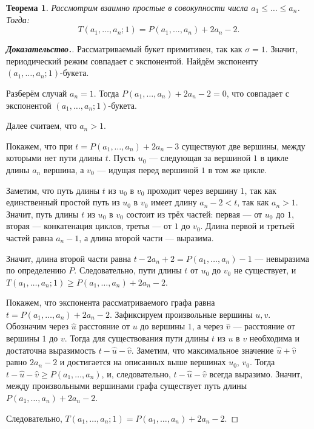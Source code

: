 \documentclass[12pt]{article}
\newtheorem{theorem}{Теорема}[section]
\theoremstyle{definition}
\begin{document}
\begin{theorem}
\label{thTP}
Рассмотрим взаимно простые в совокупности числа $a_1 \le \dots \le a_n$. Тогда: 
\begin{equation*}
T(a_1, \dots, a_n; 1) = P(a_1, \dots, a_n) + 2a_n - 2.
\end{equation*}
\end{theorem}
\begin{proof}[\textbf{Доказательство.}]
Рассматриваемый букет примитивен, так как $\sigma = 1$. Значит, периодический режим совпадает с экспонентой. Найдём экспоненту $(a_1, \dots, a_n; 1)$-букета.

Разберём случай $a_n = 1$. Тогда $P(a_1, \dots, a_n) + 2a_n - 2 = 0$, что совпадает с экспонентой $(a_1, \dots, a_n; 1)$-букета.

Далее считаем, что $a_n > 1$.

Покажем, что при $t = P(a_1, \dots, a_n) + 2a_n - 3$ существуют две вершины, между которыми нет пути длины $t$. Пусть $u_0$ --- следующая за вершиной $1$ в цикле длины $a_n$ вершина, а $v_0$ --- идущая перед вершиной $1$ в том же цикле.

Заметим, что путь длины $t$ из $u_0$ в $v_0$ проходит через вершину $1$, так как единственный простой путь из $u_0$ в $v_0$ имеет длину $a_n - 2 < t$, так как $a_n > 1$. Значит, путь длины $t$ из $u_0$ в $v_0$ состоит из трёх частей: первая --- от $u_0$ до $1$, вторая --- конкатенация циклов, третья --- от $1$ до $v_0$. Длина первой и третьей частей равна $a_n - 1$, а длина второй части --- выразима. 

Значит, длина второй части равна $t - 2a_n + 2 = P(a_1, \dots, a_n) - 1$ --- невыразима по определению $P$. Следовательно, пути длины $t$ от $u_0$ до $v_0$ не существует, и $T(a_1, \dots, a_n; 1) \ge P(a_1, \dots, a_n) + 2a_n - 2$.

Покажем, что экспонента рассматриваемого графа равна $t = P(a_1, \dots, a_n) + 2a_n - 2$. Зафиксируем произвольные вершины $u, v$. Обозначим через $\hat{u}$ расстояние от $u$ до вершины $1$, а через $\hat{v}$ --- расстояние от вершины $1$ до $v$. Тогда для существования пути длины $t$ из $u$ в $v$ необходима и достаточна выразимость $t - \hat{u} - \hat{v}$. Заметим, что максимальное значение $\hat{u} + \hat{v}$ равно $2a_n - 2$ и достигается на описанных выше вершинах $u_0$, $v_0$. Тогда $t - \hat{u} - \hat{v} \ge P(a_1, \dots, a_n)$, и, следовательно, $t - \hat{u} - \hat{v}$ всегда выразимо. Значит, между произвольными вершинами графа существует путь длины $P(a_1, \dots, a_n) + 2a_n - 2$.

Следовательно, $T(a_1, \dots, a_n; 1) = P(a_1, \dots, a_n) + 2a_n - 2$.
\end{proof}
\end{document}

